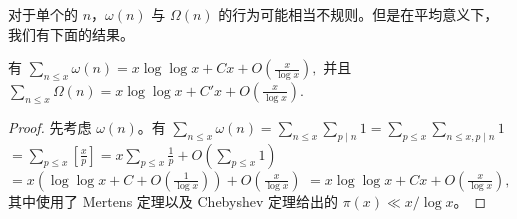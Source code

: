 对于单个的 $n$，$\omega(n)$ 与 $\Omega(n)$ 的行为可能相当不规则。但是在平均意义下，我们有下面的结果。

\begin{theorem}[原文 Theorem 3.9]
	有
	\(\textstyle \sum_{n\leq\allowbreak{} x}\omega(n) =\allowbreak{} x\log\log x+\allowbreak{}Cx+\allowbreak{}O\left(\frac{x}{\log x}\right),\allowbreak{}\)
	并且
	\(\textstyle \sum_{n\leq\allowbreak{} x}\Omega(n) =\allowbreak{} x\log\log x+\allowbreak{}C'x+\allowbreak{}O\left(\frac{x}{\log x}\right).\)
\end{theorem}

\begin{proof}
	先考虑 $\omega(n)$。有
	\(\textstyle \sum_{n\leq\allowbreak{} x}\omega(n) =\allowbreak{} \sum_{n\leq\allowbreak{} x}\sum_{p\mid\allowbreak{} n}1 =\allowbreak{} \sum_{p\leq\allowbreak{} x}\sum_{n\leq\allowbreak{} x,\allowbreak{} p\mid\allowbreak{} n}1\) \(\textstyle =\allowbreak{} \sum_{p\leq\allowbreak{} x}\left[\frac xp\right] =\allowbreak{} x\sum_{p\leq\allowbreak{} x}\frac1p+\allowbreak{}O\left(\sum_{p\leq\allowbreak{} x}1\right)\) \(\textstyle =\allowbreak{} x\left(\log\log x+\allowbreak{}C+\allowbreak{}O\left(\frac1{\log x}\right)\right) +\allowbreak{}O\left(\frac{x}{\log x}\right)\) \(\textstyle =\allowbreak{} x\log\log x+\allowbreak{}Cx+\allowbreak{}O\left(\frac{x}{\log x}\right),\allowbreak{}\)
	其中使用了 Mertens 定理以及 Chebyshev 定理给出的 $\pi(x)\ll x/\log x$。


\end{proof}
